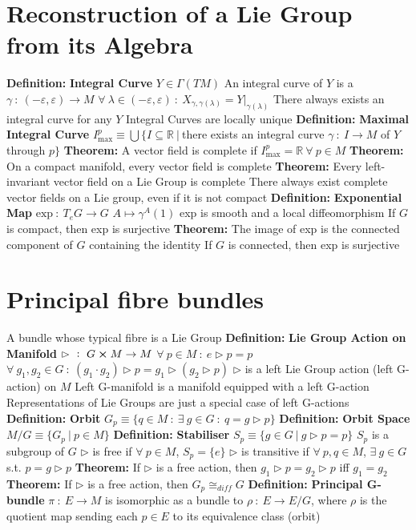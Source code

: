 \documentclass[14pt]{extarticle}
\def\Definition{{\color{blue} \textbf{Definition:} }}
\def\Theorem{{\color{red} \textbf{Theorem:} }}
\begin{document}
\begin{outline}
	\section*{Reconstruction of a Lie Group from its Algebra}
		\1	\Definition \textbf{Integral Curve}
			\2	$Y \in \Gamma(TM)$
			\2	An integral curve of $Y$ is a $\gamma~:~(-\varepsilon,\varepsilon) \rightarrow M$
			\2	$\forall~\lambda \in (-\varepsilon,\varepsilon)~:~X_{\gamma,\gamma(\lambda)} = Y|_{\gamma(\lambda)}$
			\2	There always exists an integral curve for any $Y$
			\2	Integral Curves are locally unique
		\1	\Definition \textbf{Maximal Integral Curve}
			\2	$I^p_{\text{max}} \equiv \bigcup\{I \subseteq \mathbb{R}~|~$there 
					exists an integral curve $\gamma~:~I \rightarrow M$ of $Y$ through $p\}$
		\1	\Theorem A vector field is complete if $I_{\text{max}}^p = \mathbb{R}~\forall~p \in M$
		\1	\Theorem On a compact manifold, every vector field is complete
		\1	\Theorem Every left-invariant vector field on a Lie Group is complete
			\2	There always exist complete vector fields on a Lie group, even if 
					it is not compact
		\1	\Definition \textbf{Exponential Map}
			\2	$\text{exp}~:~T_eG \rightarrow G$
			\2	$A \mapsto \gamma^A(1)$
			\2	exp is smooth and a local diffeomorphism
			\2	If $G$ is compact, then exp is surjective
		\1	\Theorem The image of exp is the connected component
				of $G$ containing the identity
			\2	If $G$ is connected, then exp is surjective
	
	\section*{Principal fibre bundles}
		\1	A bundle whose typical fibre is a Lie Group
		\1	\Definition \textbf{Lie Group Action on Manifold}
			\2	$\rhd~:~G \cross M \rightarrow M$
			\2	$\forall~p \in M~:~e \rhd p = p$
			\2	$\forall~g_1,g_2 \in G~:~(g_1 \cdot g_2) \rhd p = g_1 \rhd (g_2 \rhd p)$
			\2	$\rhd$ is a left Lie Group action (left G-action) on $M$
			\2	Left G-manifold is a manifold equipped with a left G-action
			\2	Representations of Lie Groups are just a special case of left G-actions
		\1	\Definition \textbf{Orbit}
			\2	$G_p \equiv \{q \in M~:~\exists~g \in G~:~q = g \rhd p\}$
			\2	\Definition \textbf{Orbit Space}
				\2	$M/G \equiv \{G_p~|~p \in M\}$
		\1	\Definition \textbf{Stabiliser}
			\2	$S_p \equiv \{g \in G~|~g \rhd p = p\}$
			\2	$S_p$ is a subgroup of $G$
			\2	$\rhd$ is free if $\forall~p \in M$, $S_p = \{e\}$
			\2	$\rhd$ is transitive if $\forall~p,q \in M$, $\exists~g \in G$ s.t. 
					$p = g \rhd p$
			\2	\Theorem If $\rhd$ is a free action, then $g_1 \rhd p = g_2 \rhd p$ iff
					$g_1 = g_2$
			\2	\Theorem If $\rhd$ is a free action, then $G_p \cong_{diff} G$
		\1	\Definition \textbf{Principal G-bundle}
			\2	$\pi~:~E \rightarrow M$ is isomorphic as a bundle to 
					$\rho~:~E \rightarrow E/G$, where $\rho$ is the quotient map
					sending each $p \in E$ to its equivalence class (orbit)
	

\end{outline}
\end{document}
